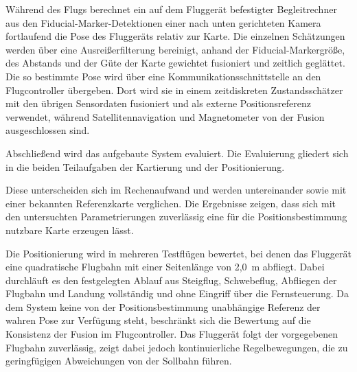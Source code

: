 Während des Flugs berechnet ein auf dem Fluggerät befestigter Begleitrechner aus den Fiducial-Marker-Detektionen einer nach unten gerichteten Kamera fortlaufend die Pose des Fluggeräts relativ zur Karte.
Die einzelnen Schätzungen werden über eine Ausreißerfilterung bereinigt, anhand der Fiducial-Markergröße, des Abstands und der Güte der Karte gewichtet fusioniert und zeitlich geglättet.
Die so bestimmte Pose wird über eine Kommunikationsschnittstelle an den Flugcontroller übergeben.
Dort wird sie in einem zeitdiskreten Zustandsschätzer mit den übrigen Sensordaten fusioniert und als externe Positionsreferenz verwendet, während Satellitennavigation und Magnetometer von der Fusion ausgeschlossen sind.

Abschließend wird das aufgebaute System evaluiert.
Die Evaluierung gliedert sich in die beiden Teilaufgaben der Kartierung und der Positionierung.

Diese unterscheiden sich im Rechenaufwand und werden untereinander sowie mit einer bekannten Referenzkarte verglichen.
Die Ergebnisse zeigen, dass sich mit den untersuchten Parametrierungen zuverlässig eine für die Positionsbestimmung nutzbare Karte erzeugen lässt.

Die Positionierung wird in mehreren Testflügen bewertet, bei denen das Fluggerät eine quadratische Flugbahn mit einer Seitenlänge von 2,0~m abfliegt.
Dabei durchläuft es den festgelegten Ablauf aus Steigflug, Schwebeflug, Abfliegen der Flugbahn und Landung vollständig und ohne Eingriff über die Fernsteuerung.
Da dem System keine von der Positionsbestimmung unabhängige Referenz der wahren Pose zur Verfügung steht, beschränkt sich die Bewertung auf die Konsistenz der Fusion im Flugcontroller.
Das Fluggerät folgt der vorgegebenen Flugbahn zuverlässig, zeigt dabei jedoch kontinuierliche Regelbewegungen, die zu geringfügigen Abweichungen von der Sollbahn führen.
